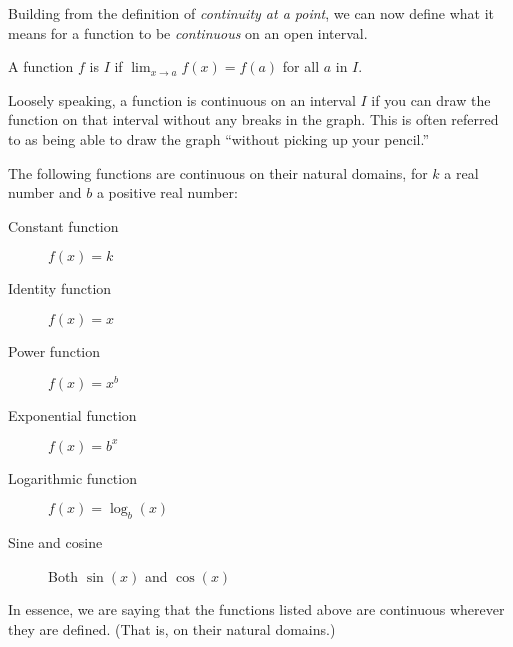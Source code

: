 \documentclass{ximera}
\begin{document}
Building from the definition of \textit{continuity at a point}, we can
now define what it means for a function to be \textit{continuous} on
an open interval.

\begin{definition}
  A function $f$ is  $I$ if
  $\lim_{x\to a} f(x) = f(a)$ for all $a$ in $I$.
\end{definition}

Loosely speaking, a function is continuous on an interval $I$ if you
can draw the function on that interval without any breaks in the
graph.  This is often referred to as being able to draw the graph
``without picking up your pencil.''

\begin{theorem}\label{theorem:continuity}
The following functions are continuous on their natural domains, for $k$ a real number and $b$ a positive real number:
\begin{description}
\item[Constant function] $f(x) =k$
\item[Identity function] $f(x) = x$ 
\item[Power function] $f(x)=x^b$ 
\item[Exponential function] $f(x)=b^x$ 
\item[Logarithmic function] $f(x)=\log_b(x)$ 
\item[Sine and cosine] Both $\sin(x)$ and $\cos(x)$ 
\end{description}
In essence, we are saying that the functions listed above are
continuous wherever they are defined. (That is, on their natural domains.)
\end{theorem}
\end{document}
